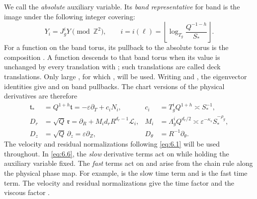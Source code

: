 We call  the \emph{absolute} auxiliary variable. Its \emph{band representative} for band  is the image  under the following integer covering:
\begin{equation}
 Y_i=J_g^iY\pmod{\mathbb Z^2},
 \qquad
 i=i(\ell)=\left\lfloor\log_{T_g}\frac{Q^{-1-h}}{S_*}\right\rfloor.
 \tag{6.5}\label{eq:6.5}
\end{equation}
For a function  on the band torus, its pullback to the absolute torus is the composition . A function descends to that band torus when its value is unchanged by every translation  with ; such translations are called deck translations. Only large , for which , will be used. Writing  and , the eigenvector identities give  and  on band pullbacks. The chart versions of the physical derivatives are therefore
\begin{equation}
\begin{aligned}
 \mathfrak t_*&=Q^{1+h}\mathfrak t=-\varepsilon\partial_T+c_iN_i,
 &c_i&=T_g^iQ^{1+h}\asymp S_*^{-1},\\
 D_r&=\sqrt Q\,\mathfrak r=\partial_R+M_id_rR^{d_r-1}\mathcal L_i,
 &M_i&=\Lambda_g^iQ^{d_r/2}\asymp\varepsilon^{-\kappa_s}S_*^{-\rho_g},\\
 D_z&=\sqrt Q\,\partial_z=\varepsilon\partial_Z,
 &D_\theta&=R^{-1}\partial_\theta.
\end{aligned}
\tag{6.6}\label{eq:6.6}
\end{equation}
The velocity and residual normalizations following \eqref{eq:6.1} will be used throughout. In \eqref{eq:6.6}, the \emph{slow} derivative terms act on  while holding the auxiliary variable  fixed. The \emph{fast} terms act on  and arise from the chain rule along the physical phase map. For example,  is the slow time term and  is the fast time term. The velocity and residual normalizations give the time factor  and the viscous factor .

